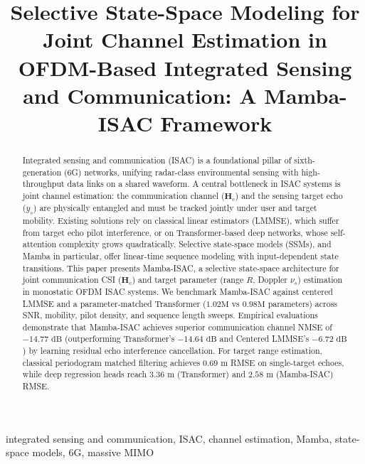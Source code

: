 \documentclass[conference]{IEEEtran}
\begin{document}
\title{Selective State-Space Modeling for Joint Channel Estimation in OFDM-Based Integrated Sensing and Communication: A Mamba-ISAC Framework}

\author{
}

\maketitle

\begin{abstract}
Integrated sensing and communication (ISAC) is a foundational pillar of sixth-generation (6G) networks, unifying radar-class environmental sensing with high-throughput data links on a shared waveform. A central bottleneck in ISAC systems is joint channel estimation: the communication channel ($\mathbf{H}_c$) and the sensing target echo ($y_s$) are physically entangled and must be tracked jointly under user and target mobility. Existing solutions rely on classical linear estimators (LMMSE), which suffer from target echo pilot interference, or on Transformer-based deep networks, whose self-attention complexity grows quadratically. Selective state-space models (SSMs), and Mamba in particular, offer linear-time sequence modeling with input-dependent state transitions. This paper presents Mamba-ISAC, a selective state-space architecture for joint communication CSI ($\mathbf{H}_c$) and target parameter (range $R$, Doppler $\nu_s$) estimation in monostatic OFDM ISAC systems. We benchmark Mamba-ISAC against centered LMMSE and a parameter-matched Transformer ($1.02\text{M}$ vs $0.98\text{M}$ parameters) across SNR, mobility, pilot density, and sequence length sweeps. Empirical evaluations demonstrate that Mamba-ISAC achieves superior communication channel NMSE of $-14.77\text{ dB}$ (outperforming Transformer's $-14.64\text{ dB}$ and Centered LMMSE's $-6.72\text{ dB}$) by learning residual echo interference cancellation. For target range estimation, classical periodogram matched filtering achieves $0.69\text{ m}$ RMSE on single-target echoes, while deep regression heads reach $3.36\text{ m}$ (Transformer) and $2.58\text{ m}$ (Mamba-ISAC) RMSE.
\end{abstract}

\begin{IEEEkeywords}
integrated sensing and communication, ISAC, channel estimation, Mamba, state-space models, 6G, massive MIMO
\end{IEEEkeywords}
\end{document}
